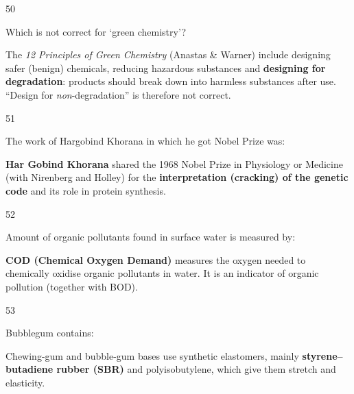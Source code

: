 \begin{question}{50}
{Which is not correct for `green chemistry'?\par}
\begin{explain}
The \emph{12 Principles of Green Chemistry} (Anastas \& Warner) include designing safer (benign) chemicals, reducing hazardous substances and \textbf{designing for degradation}: products should break down into harmless substances after use. ``Design for \emph{non}-degradation'' is therefore not correct.
\end{explain}
\end{question}

\begin{question}{51}
{The work of Hargobind Khorana in which he got Nobel Prize was:\par}
\begin{explain}
\textbf{Har Gobind Khorana} shared the 1968 Nobel Prize in Physiology or Medicine (with Nirenberg and Holley) for the \textbf{interpretation (cracking) of the genetic code} and its role in protein synthesis.
\end{explain}
\end{question}

\begin{question}{52}
{Amount of organic pollutants found in surface water is measured by:\par}
\begin{explain}
\textbf{COD (Chemical Oxygen Demand)} measures the oxygen needed to chemically oxidise organic pollutants in water. It is an indicator of organic pollution (together with BOD).
\end{explain}
\end{question}

\begin{question}{53}
{Bubblegum contains:\par}
\begin{explain}
Chewing-gum and bubble-gum bases use synthetic elastomers, mainly \textbf{styrene--butadiene rubber (SBR)} and polyisobutylene, which give them stretch and elasticity.
\end{explain}
\end{question}

